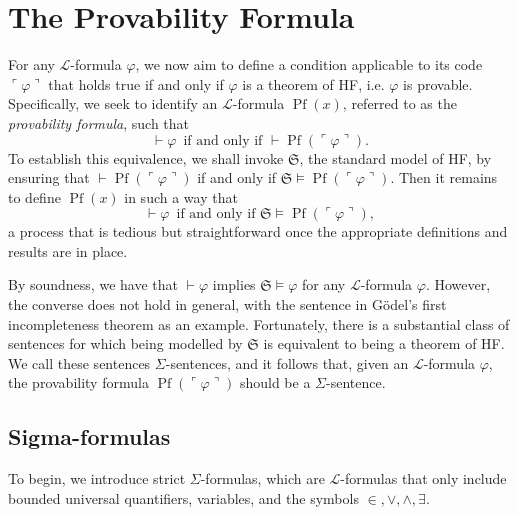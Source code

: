 \chapter{The Provability Formula}

For any $\mathcal{L}$-formula $\varphi$, we now aim to define a condition applicable to
its code $\ulcorner\varphi\urcorner$ that holds true if and only if $\varphi$ is a theorem of HF, 
i.e. $\varphi$ is provable. 
Specifically, we seek to identify an $\mathcal{L}$-formula $\operatorname{Pf}(x)$,
referred to as the \textit{provability formula}, such that
$$
\vdash \varphi \,\text{ if and only if } \vdash \operatorname{Pf}(\ulcorner{\varphi}\urcorner).
$$
To establish this equivalence, we shall invoke $\mathfrak{S}$, the standard model of HF,
by ensuring that $\vdash \operatorname{Pf}(\ulcorner{\varphi}\urcorner)$ if and only if
$\mathfrak{S} \vDash \operatorname{Pf}(\ulcorner{\varphi}\urcorner)$. 
Then it remains to define $\operatorname{Pf}(x)$ in such a way that
$$
\vdash \varphi \,\text{ if and only if } 
\mathfrak{S} \vDash \operatorname{Pf}(\ulcorner{\varphi}\urcorner),
$$
a process that is tedious but straightforward once the appropriate definitions and results 
are in place.

By soundness, we have that $\vdash \varphi$ implies 
$\mathfrak{S} \vDash \varphi$ for any $\mathcal{L}$-formula $\varphi$.
However, the converse does not hold in general, with the sentence in Gödel's first incompleteness
theorem as an example.
Fortunately, there is a substantial class of sentences for which being modelled by $\mathfrak{S}$
is equivalent to being a theorem of HF.
We call these sentences $\Sigma$-sentences, and it follows that, given an $\mathcal{L}$-formula 
$\varphi$, the provability formula $\operatorname{Pf}(\ulcorner{\varphi}\urcorner)$ should be
a $\Sigma$-sentence.

\section{Sigma-formulas}

To begin, we introduce strict $\Sigma$-formulas, 
which are $\mathcal{L}$-formulas that only include bounded universal quantifiers, variables, 
and the symbols $\in, \lor, \land, \exists$.

